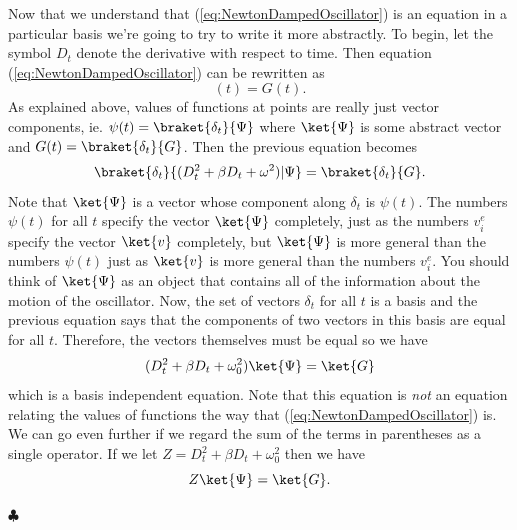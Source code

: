 Now that we understand that (\ref{eq:NewtonDampedOscillator}) is an equation in a particular basis we're going to try to write it more abstractly.  To begin, let the symbol $D_t$ denote the derivative with respect to time.  Then equation (\ref{eq:NewtonDampedOscillator}) can be rewritten as
\begin{displaymath} [(D_t^2 + \beta D_t + \omega ^2)\psi] (t) = G(t). \end{displaymath}
As explained above, values of functions at points are really just vector components, ie. $\psi(t) = \braket{\delta_t}{\Psi}$ where $\ket{\Psi}$ is some abstract vector and $G(t) = \braket{\delta_t}{G}$.  Then the previous equation becomes
\begin{displaymath} \braket{\delta_t}{(D_t^2 + \beta D_t + \omega ^2)| \Psi} = \braket{\delta_t}{G}. \end{displaymath}
Note that $\ket{\Psi}$ is a vector whose component along $\delta_t$ is $\psi(t)$.  The numbers $\psi(t)$ for all $t$ specify the vector $\ket{\Psi}$ completely, just as the numbers $v^e_i$ specify the vector $\ket{v}$ completely, but $\ket{\Psi}$ is more general than the numbers $\psi(t)$ just as $\ket{v}$ is more general than the numbers $v^e_i$.  You should think of $\ket{\Psi}$ as an object that contains all of the information about the motion of the oscillator.  Now, the set of vectors $\delta_t$ for all $t$ is a basis and the previous equation says that the components of two vectors in this basis are equal for all $t$.  Therefore, the vectors themselves must be equal so we have
\begin{displaymath} (D_t^2 + \beta D_t + \omega _0^2) \ket{\Psi} = \ket{G} \end{displaymath}
which is a basis independent equation.  Note that this equation is \emph{not} an equation relating the values of functions the way that (\ref{eq:NewtonDampedOscillator}) is.  We can go even further if we regard the sum of the terms in parentheses as a single operator.  If we let $Z = D_t^2 + \beta D_t + \omega_0^2$ then we have
\begin{equation}\label{eq:AbstractForDamped} Z \ket{\Psi} = \ket{G}. \end{equation}
\begin{flushright} $\clubsuit$ \end{flushright}